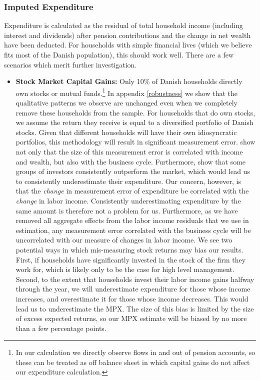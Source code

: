 \documentclass[titlepage]{\econtex}\newcommand{\texname}{ConsumptionHeterogeneity}
\begin{document}
\subsubsection{Imputed Expenditure}
Expenditure is calculated as the residual of total household income (including interest and dividends) after pension contributions and the change in net wealth have been deducted. For households with simple financial lives (which we believe fits most of the Danish population), this should work well. There are a few scenarios which merit further investigation.
\begin{itemize}
	\item \textbf{Stock Market Capital Gains:} Only 10\% of Danish households directly own stocks or mutual funds.\footnote{In our calculation we directly observe flows in and out of pension accounts, so these can be treated as off balance sheet in which capital gains do not affect our expenditure calculation.} In appendix \ref{robustness} we show that the qualitative patterns we observe are unchanged even when we completely remove these households from the sample. For households that do own stocks, we assume the return they receive is equal to a diversified portfolio of Danish stocks. Given that different households will have their own idiosyncratic portfolios, this methodology will result in significant measurement error. \cite{baker_measurement_2018} show not only that the size of this measurement error is correlated with income and wealth, but also with the business cycle. Furthermore, \cite{fagereng_persistence_2016} show that some groups of investors consistently outperform the market, which would lead us to consistently underestimate their expenditure. Our concern, however, is that the \textit{change} in measurement error of expenditure be correlated with the \textit{change} in labor income. Consistently underestimating expenditure by the same amount is therefore not a problem for us. Furthermore, as we have removed all aggregate effects from the labor income residuals that we use in estimation, any measurement error correlated with the business cycle will be uncorrelated with our measure of changes in labor income. We see two potential ways in which mis-measuring stock returns may bias our results. First, if households have significantly invested in the stock of the firm they work for, which is likely only to be the case for high level management. Second, to the extent that households invest their labor income gains halfway through the year, we will underestimate expenditure for those whose income increases, and overestimate it for those whose income decreases. This would lead us to underestimate the MPX. The size of this bias is limited by the size of excess expected returns, so our MPX estimate will be biased by no more than a few percentage points.

\end{itemize}
\end{document}
